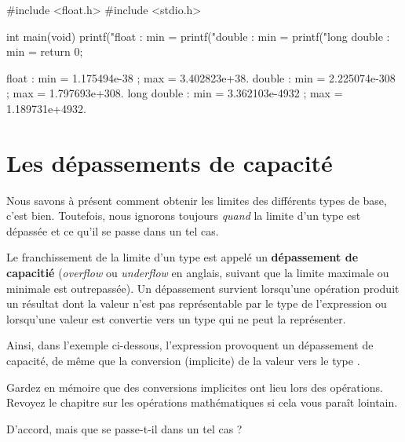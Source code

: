 \begin{C}
#include <float.h>
#include <stdio.h>


int
main(void)
{
    printf("float : min = %
    printf("double : min = %
    printf("long double : min = %
    return 0;
}
\end{C}

\begin{C}
 float : min = 1.175494e-38 ; max = 3.402823e+38.
double : min = 2.225074e-308 ; max = 1.797693e+308.
long double : min = 3.362103e-4932 ; max = 1.189731e+4932.
\end{C}

\section{Les dépassements de capacité}
\label{les-depassements-de-capacite}

Nous savons à présent comment obtenir les limites des différents types
de base, c'est bien. Toutefois, nous ignorons toujours \emph{quand} la
limite d'un type est dépassée et ce qu'il se passe dans un tel cas.

Le franchissement de la limite d'un type est appelé un
\textbf{dépassement de capacitié} (\emph{overflow} ou \emph{underflow}
en anglais, suivant que la limite maximale ou minimale est outrepassée).
Un dépassement survient lorsqu'une opération produit un résultat dont la
valeur n'est pas représentable par le type de l'expression ou lorsqu'une
valeur est convertie vers un type qui ne peut la représenter.

Ainsi, dans l'exemple ci-dessous, l'expression 
provoquent un dépassement de capacité, de même que la conversion
(implicite) de la valeur  vers le type
.

\begin{C}

\end{C}

\begin{attentionbox}
  Gardez en mémoire que des conversions
implicites ont lieu lors des opérations. Revoyez le chapitre sur les
opérations mathématiques si cela vous paraît lointain.
\end{attentionbox}


\begin{questionbox}
  D'accord, mais que se passe-t-il dans un tel cas ?
\end{questionbox}


